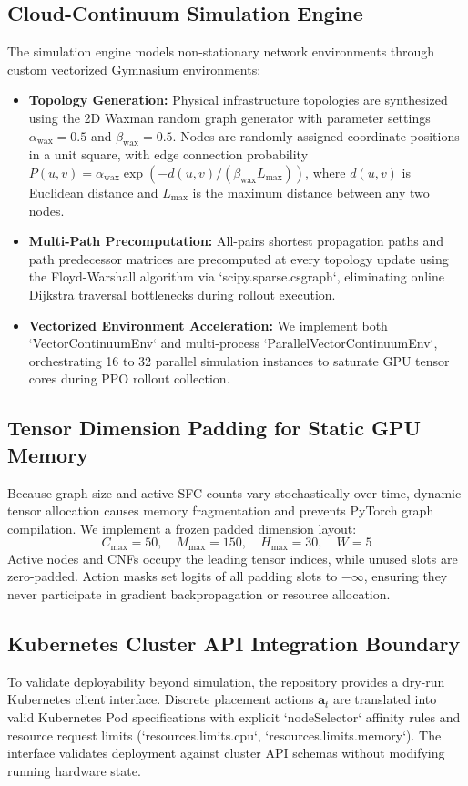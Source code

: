 \documentclass[conference]{IEEEtran}
\begin{document}
\subsection{Cloud-Continuum Simulation Engine}
The simulation engine models non-stationary network environments through custom vectorized Gymnasium environments:
\begin{itemize}
    \item \textbf{Topology Generation:} Physical infrastructure topologies are synthesized using the 2D Waxman random graph generator with parameter settings $\alpha_{\text{wax}} = 0.5$ and $\beta_{\text{wax}} = 0.5$. Nodes are randomly assigned coordinate positions in a unit square, with edge connection probability $P(u, v) = \alpha_{\text{wax}} \exp(-d(u, v) / (\beta_{\text{wax}} L_{\max}))$, where $d(u, v)$ is Euclidean distance and $L_{\max}$ is the maximum distance between any two nodes.
    \item \textbf{Multi-Path Precomputation:} All-pairs shortest propagation paths and path predecessor matrices are precomputed at every topology update using the Floyd-Warshall algorithm via `scipy.sparse.csgraph`, eliminating online Dijkstra traversal bottlenecks during rollout execution.
    \item \textbf{Vectorized Environment Acceleration:} We implement both `VectorContinuumEnv` and multi-process `ParallelVectorContinuumEnv`, orchestrating 16 to 32 parallel simulation instances to saturate GPU tensor cores during PPO rollout collection.
\end{itemize}

\subsection{Tensor Dimension Padding for Static GPU Memory}
Because graph size and active SFC counts vary stochastically over time, dynamic tensor allocation causes memory fragmentation and prevents PyTorch graph compilation. We implement a frozen padded dimension layout:
\begin{equation}
C_{\max} = 50, \quad M_{\max} = 150, \quad H_{\max} = 30, \quad W = 5
\end{equation}
Active nodes and CNFs occupy the leading tensor indices, while unused slots are zero-padded. Action masks set logits of all padding slots to $-\infty$, ensuring they never participate in gradient backpropagation or resource allocation.

\subsection{Kubernetes Cluster API Integration Boundary}
To validate deployability beyond simulation, the repository provides a dry-run Kubernetes client interface. Discrete placement actions $\mathbf{a}_t$ are translated into valid Kubernetes Pod specifications with explicit `nodeSelector` affinity rules and resource request limits (`resources.limits.cpu`, `resources.limits.memory`). The interface validates deployment against cluster API schemas without modifying running hardware state.
\end{document}
